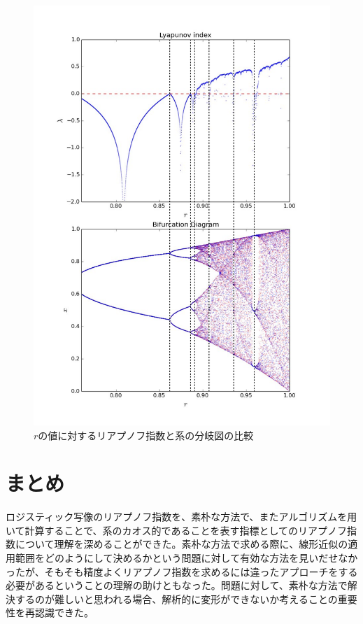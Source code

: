 \documentclass{jsarticle}
\begin{document}
\begin{enumerate}
\begin{enumerate}
                \begin{figure}[H]   
                    \begin{center}
                        \includegraphics[width=14.5cm]{figure_13.pdf}
                        \caption{$r$の値に対するリアプノフ指数と系の分岐図の比較}
                        \label{fig:f10}
                    \end{center}
                \end{figure}
                
           
                
            \end{enumerate} 
            
        \end{enumerate}
    
    \section{まとめ}
        ロジスティック写像のリアプノフ指数を、素朴な方法で、またアルゴリズムを用いて計算することで、系のカオス的であることを表す指標としてのリアプノフ指数について理解を深めることができた。素朴な方法で求める際に、線形近似の適用範囲をどのようにして決めるかという問題に対して有効な方法を見いだせなかったが、そもそも精度よくリアプノフ指数を求めるには違ったアプローチをする必要があるということの理解の助けともなった。問題に対して、素朴な方法で解決するのが難しいと思われる場合、解析的に変形ができないか考えることの重要性を再認識できた。
    
\end{document}
